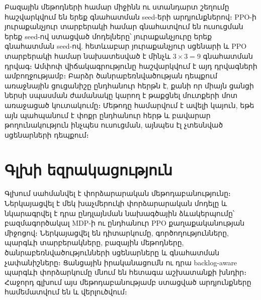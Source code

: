 \documentclass[12pt,a4paper]{extreport}
\begin{document}
Բազային մեթոդների համար միջինն ու ստանդարտ շեղումը հաշվարկվում են երեք գնահատման seed-երի արդյունքներով։ PPO-ի յուրաքանչյուր տարբերակի համար գնահատվում են ուսուցման երեք seed-ով ստացված մոդելները՝ յուրաքանչյուրը երեք գնահատման seed-ով. հետևաբար յուրաքանչյուր սցենարի և PPO տարբերակի համար նախատեսված է մինչև $3\times3=9$ գնահատման դրվագ։ Ամփոփ վիճակագրությունը հաշվարկվում է այդ դրվագների ամբողջությամբ։ Բարձր ծանրաբեռնվածության դեպքում առաջնային ցուցանիշը ընդհանուր հերթն է, քանի որ միայն ցանցի ներսի սպասման ժամանակը կարող է թաքցնել մուտքերի մոտ առաջացած կուտակումը։ Մեթոդը համարվում է ավելի կայուն, եթե այն պահպանում է փոքր ընդհանուր հերթ և բավարար թողունակություն ինչպես ուսուցման, այնպես էլ չտեսնված սցենարների դեպքում։

\section{Գլխի եզրակացություն}

Գլխում սահմանվել է փորձարարական մեթոդաբանությունը։ Ներկայացվել է մեկ խաչմերուկի փորձարարական մոդելը և նկարագրվել է դրա ընդլայնման նախագծային ձևակերպումը՝ բազմագործակալ MDP-ի ու ընդհանուր PPO քաղաքականության միջոցով։ Ներկայացվել են դիտարկումը, գործողությունները, պարգևի տարբերակները, բազային մեթոդները, ծանրաբեռնվածությունների սցենարները և գնահատման չափանիշները։ Ցանցային իրականացումն ու դրա backlog-aware պարգևի փորձարկումը մնում են հետագա աշխատանքի խնդիր։ Հաջորդ գլխում այս մեթոդաբանությամբ ստացված արդյունքները համեմատվում են և վերլուծվում։

\printbibliography[title={Գրականության ցանկ}]
\end{document}

